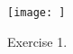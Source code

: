 %

%

\begin{figure}[h]
\centering
\texttt{[image: ]}
\caption{Exercise 1.}
\label{foobar-figure}
\end{figure}